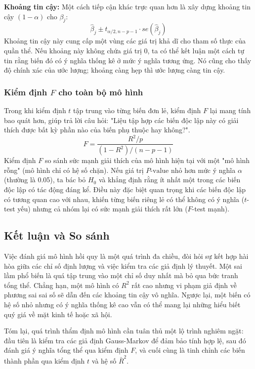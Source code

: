 \textbf{Khoảng tin cậy:} Một cách tiếp cận khác trực quan hơn là xây dựng khoảng tin cậy $(1-\alpha)$ cho $\beta_j$:
\begin{equation}
\hat{\beta}_j \pm t_{\alpha/2, n-p-1} \cdot se(\hat{\beta}_j)
\end{equation}
Khoảng tin cậy này cung cấp một vùng các giá trị khả dĩ cho tham số thực của quần thể. Nếu khoảng này không chứa giá trị 0, ta có thể kết luận một cách tự tin rằng biến đó có ý nghĩa thống kê ở mức ý nghĩa tương ứng. Nó cũng cho thấy độ chính xác của ước lượng; khoảng càng hẹp thì ước lượng càng tin cậy.

\subsubsection{Kiểm định $F$ cho toàn bộ mô hình}
Trong khi kiểm định $t$ tập trung vào từng biến đơn lẻ, kiểm định $F$ lại mang tính bao quát hơn, giúp trả lời câu hỏi: "Liệu tập hợp các biến độc lập này có giải thích được bất kỳ phần nào của biến phụ thuộc hay không?".
\begin{equation}
F = \frac{R^2/p}{(1 - R^2)/(n - p - 1)}
\end{equation}
Kiểm định $F$ so sánh sức mạnh giải thích của mô hình hiện tại với một "mô hình rỗng" (mô hình chỉ có hệ số chặn). Nếu giá trị $P\text{-value}$ nhỏ hơn mức ý nghĩa $\alpha$ (thường là 0.05), ta bác bỏ $H_0$ và khẳng định rằng ít nhất một trong các biến độc lập có tác động đáng kể. Điều này đặc biệt quan trọng khi các biến độc lập có tương quan cao với nhau, khiến từng biến riêng lẻ có thể không có ý nghĩa ($t$-test yếu) nhưng cả nhóm lại có sức mạnh giải thích rất lớn ($F$-test mạnh).

\subsection{Kết luận và So sánh}
Việc đánh giá mô hình hồi quy là một quá trình đa chiều, đòi hỏi sự kết hợp hài hòa giữa các chỉ số định lượng và việc kiểm tra các giả định lý thuyết. Một sai lầm phổ biến là quá tập trung vào một chỉ số duy nhất mà bỏ qua bức tranh tổng thể. Chẳng hạn, một mô hình có $R^2$ rất cao nhưng vi phạm giả định về phương sai sai số sẽ dẫn đến các khoảng tin cậy vô nghĩa. Ngược lại, một biến có hệ số nhỏ nhưng có ý nghĩa thống kê cao vẫn có thể mang lại những hiểu biết quý giá về mặt kinh tế hoặc xã hội.

Tóm lại, quá trình thẩm định mô hình cần tuân thủ một lộ trình nghiêm ngặt: đầu tiên là kiểm tra các giả định Gauss-Markov để đảm bảo tính hợp lệ, sau đó đánh giá ý nghĩa tổng thể qua kiểm định $F$, và cuối cùng là tinh chỉnh các biến thành phần qua kiểm định $t$ và hệ số $\bar{R}^2$.

